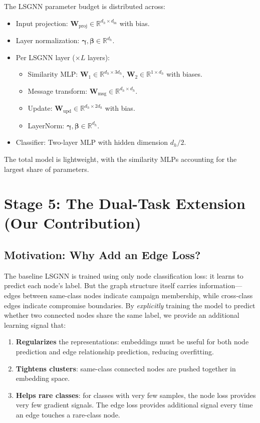 \documentclass[conference]{IEEEtran}
\newcommand{\R}{\mathbb{R}}
\newcommand{\mat}[1]{\mathbf{#1}}
\begin{document}
The LSGNN parameter budget is distributed across:
\begin{itemize}
    \item Input projection: $\mat{W}_{\text{proj}} \in \R^{d_h \times d_{\text{in}}}$ with bias.
    \item Layer normalization: $\bm{\gamma}, \bm{\beta} \in \R^{d_h}$.
    \item Per LSGNN layer ($\times L$ layers):
    \begin{itemize}
        \item Similarity MLP: $\mat{W}_1 \in \R^{d_h \times 3d_h}$, $\mat{W}_2 \in \R^{1 \times d_h}$ with biases.
        \item Message transform: $\mat{W}_{\text{msg}} \in \R^{d_h \times d_h}$.
        \item Update: $\mat{W}_{\text{upd}} \in \R^{d_h \times 2d_h}$ with bias.
        \item LayerNorm: $\bm{\gamma}, \bm{\beta} \in \R^{d_h}$.
    \end{itemize}
    \item Classifier: Two-layer MLP with hidden dimension $d_h / 2$.
\end{itemize}
The total model is lightweight, with the similarity MLPs accounting for the largest share of parameters.

\section{Stage 5: The Dual-Task Extension (Our Contribution)}
\label{sec:dual}

\subsection{Motivation: Why Add an Edge Loss?}

The baseline LSGNN is trained using only node classification loss: it learns to predict each node's label. But the graph structure itself carries information---edges between same-class nodes indicate campaign membership, while cross-class edges indicate compromise boundaries. By \emph{explicitly} training the model to predict whether two connected nodes share the same label, we provide an additional learning signal that:

\begin{enumerate}
    \item \textbf{Regularizes} the representations: embeddings must be useful for both node prediction and edge relationship prediction, reducing overfitting.
    \item \textbf{Tightens clusters}: same-class connected nodes are pushed together in embedding space.
    \item \textbf{Helps rare classes}: for classes with very few samples, the node loss provides very few gradient signals. The edge loss provides additional signal every time an edge touches a rare-class node.
\end{enumerate}
\end{document}
